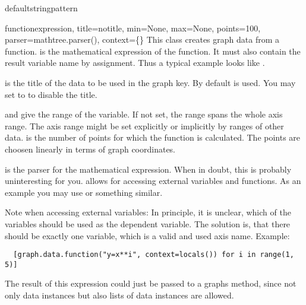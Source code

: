 \begin{memberdesc}{defaultstringpattern}
\end{memberdesc}

\begin{classdesc}{function}{expression, title=notitle,
                            min=None, max=None, points=100,
                            parser=mathtree.parser(),
                            context=\{\}}
  This class creates graph data from a function.  is
  the mathematical expression of the function. It must also contain
  the result variable name by assignment. Thus a typical example looks
  like .

   is the title of the data to be used in the graph key. By
  default  is used. You may set  to
   to disable the title.

   and  give the range of the variable. If not set,
  the range spans the whole axis range. The axis range might be set
  explicitly or implicitly by ranges of other data.  is
  the number of points for which the function is calculated. The
  points are choosen linearly in terms of graph coordinates.

   is the parser for the mathematical expression. When in
  doubt, this is probably uninteresting for you.  allows
  for accessing external variables and functions. As an example you
  may use  or something similar.

  Note when accessing external variables: In principle, it is unclear, 
  which of the variables should be used as the
  dependent variable. The solution is, that there should be exactly
  one variable, which is a valid and used axis name.
  Example:
  \begin{verbatim}
  [graph.data.function("y=x**i", context=locals()) for i in range(1, 5)]
  \end{verbatim}
  The result of this expression could just be passed to a graphs
   method, since not only data instances but also lists
  of data instances are allowed.
\end{classdesc}

